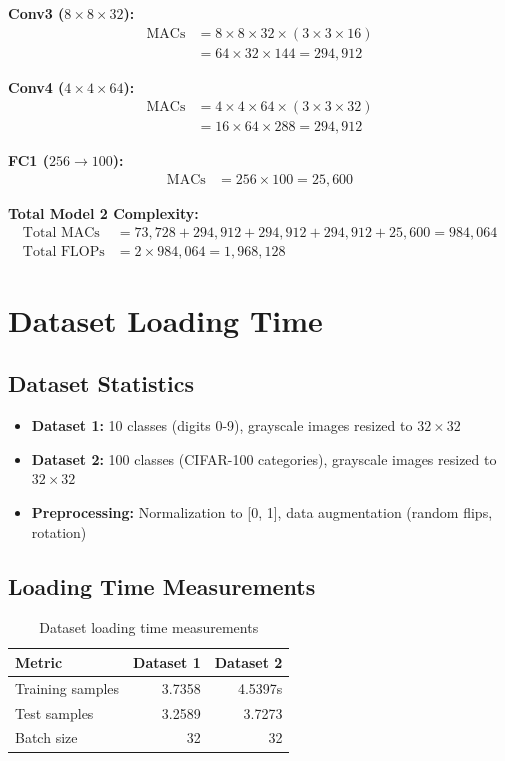 \documentclass[11pt,a4paper]{article}
\begin{document}
\textbf{Conv3 ($8 \times 8 \times 32$):}
\begin{align*}
\text{MACs} &= 8 \times 8 \times 32 \times (3 \times 3 \times 16) \\
&= 64 \times 32 \times 144 = 294,912
\end{align*}

\textbf{Conv4 ($4 \times 4 \times 64$):}
\begin{align*}
\text{MACs} &= 4 \times 4 \times 64 \times (3 \times 3 \times 32) \\
&= 16 \times 64 \times 288 = 294,912
\end{align*}

\textbf{FC1 ($256 \to 100$):}
\begin{align*}
\text{MACs} &= 256 \times 100 = 25,600
\end{align*}

\textbf{Total Model 2 Complexity:}
\begin{align*}
\text{Total MACs} &= 73,728 + 294,912 + 294,912 + 294,912 + 25,600 = \boxed{984,064} \\
\text{Total FLOPs} &= 2 \times 984,064 = \boxed{1,968,128}
\end{align*}

\section{Dataset Loading Time}

\subsection{Dataset Statistics}
\begin{itemize}
    \item \textbf{Dataset 1:} 10 classes (digits 0-9), grayscale images resized to $32 \times 32$
    \item \textbf{Dataset 2:} 100 classes (CIFAR-100 categories), grayscale images resized to $32 \times 32$
    \item \textbf{Preprocessing:} Normalization to [0, 1], data augmentation (random flips, rotation)
\end{itemize}

\subsection{Loading Time Measurements}
\begin{table}[H]
\centering
\begin{tabular}{lrr}
\toprule
\textbf{Metric} & \textbf{Dataset 1} & \textbf{Dataset 2} \\
\midrule
Training samples & 3.7358 & 4.5397s \\
Test samples & 3.2589 & 3.7273 \\
Batch size & 32 & 32 \\
\bottomrule
\end{tabular}
\caption{Dataset loading time measurements}
\end{table}
\end{document}
